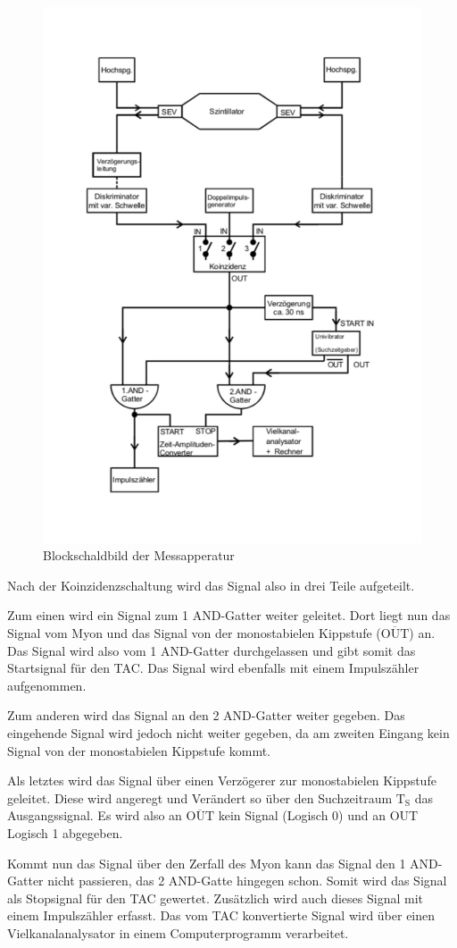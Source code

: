 \begin{figure}[h!]
  \centering
  \includegraphics[width=0.6 \textwidth]{schaltung.pdf}
  \caption{Blockschaldbild der Messapperatur}
  \label{fig:block}
\end{figure}
\FloatBarrier

Nach der Koinzidenzschaltung wird das Signal also in drei Teile aufgeteilt.

Zum einen wird ein Signal zum 1 AND-Gatter weiter geleitet.
Dort liegt nun das Signal vom Myon und das Signal von der monostabielen Kippstufe ($\overline{\text{OUT}}$) an.
Das Signal wird also vom 1 AND-Gatter durchgelassen und gibt somit das Startsignal für den TAC.
Das Signal wird ebenfalls mit einem Impulszähler aufgenommen.

Zum anderen wird das Signal an den 2 AND-Gatter weiter gegeben.
Das eingehende Signal wird jedoch nicht weiter gegeben, da am zweiten Eingang kein Signal von der monostabielen Kippstufe kommt.

Als letztes wird das Signal über einen Verzögerer zur monostabielen Kippstufe geleitet.
Diese wird angeregt und Verändert so über den Suchzeitraum $\text{T}_{\text{S}}$ das Ausgangssignal.
Es wird also an $\overline{\text{OUT}}$ kein Signal (Logisch 0) und an OUT Logisch 1 abgegeben.

Kommt nun das Signal über den Zerfall des Myon kann das Signal den 1 AND-Gatter nicht passieren, das 2 AND-Gatte hingegen schon.
Somit wird das Signal als Stopsignal für den TAC gewertet.
Zusätzlich wird auch dieses Signal mit einem Impulszähler erfasst.
Das vom TAC konvertierte Signal wird über einen Vielkanalanalysator in einem Computerprogramm verarbeitet.

